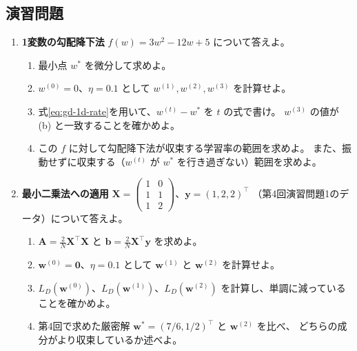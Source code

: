 \subsection{演習問題}

\begin{enumerate}

  \item \textbf{1変数の勾配降下法}\quad
    $f(w) = 3w^2 - 12w + 5$ について答えよ。
    \begin{enumerate}
      \item 最小点 $w^*$ を微分して求めよ。
      \item $w^{(0)} = 0$、$\eta = 0.1$ として $w^{(1)}, w^{(2)}, w^{(3)}$ を計算せよ。
      \item 式\eqref{eq:gd-1d-rate}を用いて、$w^{(t)} - w^*$ を $t$ の式で書け。
        $w^{(3)}$ の値が (b) と一致することを確かめよ。
      \item この $f$ に対して勾配降下法が収束する学習率の範囲を求めよ。
        また、振動せずに収束する（$w^{(t)}$ が $w^*$ を行き過ぎない）範囲を求めよ。
    \end{enumerate}

  \item \textbf{最小二乗法への適用}\quad
    $\bm{X} = \begin{pmatrix} 1 & 0 \\ 1 & 1 \\ 1 & 2 \end{pmatrix}$、$\bm{y} = (1, 2, 2)^\top$
    （第4回演習問題1のデータ）について答えよ。
    \begin{enumerate}
      \item $\bm{A} = \frac{2}{N}\bm{X}^\top\bm{X}$ と $\bm{b} = \frac{2}{N}\bm{X}^\top\bm{y}$ を求めよ。
      \item $\bm{w}^{(0)} = \bm{0}$、$\eta = 0.1$ として $\bm{w}^{(1)}$ と $\bm{w}^{(2)}$ を計算せよ。
      \item $L_D(\bm{w}^{(0)})$、$L_D(\bm{w}^{(1)})$、$L_D(\bm{w}^{(2)})$ を計算し、単調に減っていることを確かめよ。
      \item 第4回で求めた厳密解 $\bm{w}^* = (7/6, 1/2)^\top$ と $\bm{w}^{(2)}$ を比べ、
        どちらの成分がより収束しているか述べよ。
    \end{enumerate}


\end{enumerate}
